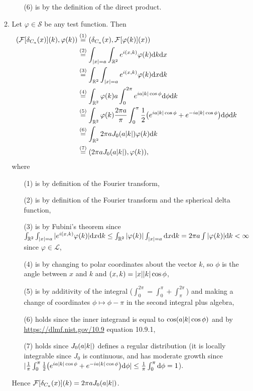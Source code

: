 \documentclass[11pt]{article}
\newcommand{\eq}[1]{\overset{(#1)}{=}}
\begin{document}
\begin{enumerate}
\begin{enumerate}[label=(\roman*)]
\begin{enumerate}
            \item[(6)] is by the definition of the direct product.
        \end{enumerate}
        \item Let $\varphi\in\mathcal S$ be any test function. Then \begin{align*}
            (\mathcal F[\delta_{C_a}(x)](k),\varphi(k)) &\eq{1} (\delta_{C_a}(x),\mathcal F[\varphi(k)](x)) \\
            &\eq{2} \int_{\abs{x} = a}\int_{\mathbb{R}^2}e^{i(x,k)}\varphi(k)\dd k \dd x\\
            &\eq{3} \int_{\mathbb{R}^2}\int_{\abs{x} = a}e^{i(x,k)}\varphi(k) \dd x \dd k\\
            &\eq{4} \int_{\mathbb R^2}\varphi(k)a\int_0^{2\pi} e^{ia \abs{k}\cos\phi}\dd \phi\dd k\\
            &\eq{5} \int_{\mathbb R^2}\varphi(k)\frac{2\pi a}{\pi}\int_0^{\pi} \frac{1}{2}\big(e^{ia \abs{k}\cos\phi}+e^{-ia \abs{k}\cos\phi}\big)\dd \phi\dd k\\
            &\eq{6} \int_{\mathbb R^2}2\pi a J_0(a\abs{k}) \varphi(k)\dd k\\
            &\eq{7} (2\pi a J_0(a\abs{k}),\varphi(k)),
        \end{align*} where \begin{enumerate}
            \item[(1)] is by definition of the Fourier transform,
            \item[(2)] is by definition of the Fourier transform and the spherical delta function,
            \item[(3)] is by Fubini's theorem since $\int_{\mathbb R^2}\int_{\abs{x} = a}|e^{i(x,k)}\varphi(k)|\dd x \dd k\leq \int_{\mathbb R^2}\abs{\varphi(k)}\int_{\abs{x} = a}\dd x \dd k = 2\pi a\int\abs{\varphi(k)}\dd k < \infty$ since $\varphi\in \mathcal L$,
            \item[(4)] is by changing to polar coordinates about the vector $k$, so $\phi$ is the angle between $x$ and $k$ and $(x,k) = \abs{x}\abs{k}\cos\phi$,
            \item[(5)] is by additivity of the integral ($\int_0^{2\pi} = \int_0^\pi + \int_\pi^{2\pi}$) and making a change of coordinates $\phi\mapsto\phi - \pi$ in the second integral plus algebra,
            \item[(6)] holds since the inner integrand is equal to $\cos(a\abs{k}\cos\phi)$ and by \hyperref{https://dlmf.nist.gov/10.9}{website}{https://dlmf.nist.gov/10.9}{https://dlmf.nist.gov/10.9} equation 10.9.1,
            \item[(7)] holds since $J_0(a\abs{k})$ defines a regular distribution (it is locally integrable since $J_0$ is continuous, and has moderate growth since $|\frac{1}{\pi}\int_0^{\pi} \frac{1}{2}\big(e^{ia \abs{k}\cos\phi}+e^{-ia \abs{k}\cos\phi}\big)\dd \phi|\leq \frac{1}{\pi}\int_0^\pi \dd\phi = 1$).
        \end{enumerate} Hence $\mathcal F[\delta_{C_a}(x)](k) = 2\pi a J_0(a\abs{k})$.
    \end{enumerate}


\end{enumerate}
\end{document}
